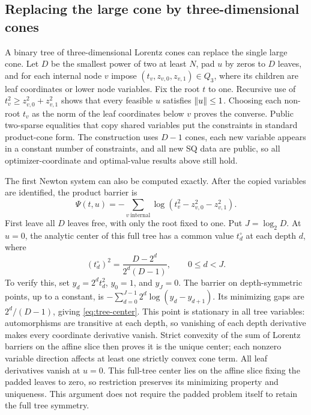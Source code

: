 \subsection{Replacing the large cone by three-dimensional cones}

A binary tree of three-dimensional Lorentz cones can replace the single
large cone.  Let $D$ be the smallest power of two at
least $N$, pad $u$ by zeros to $D$ leaves, and for each internal node
$v$ impose $(t_v,z_{v,0},z_{v,1})\in Q_3$, where its children are leaf
coordinates or lower node variables.  Fix the root $t$ to one.
Recursive use of $t_v^2\geq z_{v,0}^2+z_{v,1}^2$ shows that every feasible
$u$ satisfies $\left\lVert u\right\rVert\leq1$.  Choosing each non-root $t_v$
as the norm of the leaf coordinates below $v$ proves the converse.  Public two-sparse equalities that copy
shared variables put the constraints in standard product-cone form.  The
construction uses $D-1$ cones, each new variable appears in a constant
number of constraints, and all new SQ data are public, so all
optimizer-coordinate and optimal-value results above still hold.

The first Newton system can also be computed exactly.  After the copied
variables are identified, the product barrier is
\[
 \Psi(t,u)=-\sum_{v\ \mathrm{internal}}
       \log(t_v^2-z_{v,0}^2-z_{v,1}^2).
\]
First leave all $D$ leaves free, with only the root fixed to one.
Put $J=\log_2D$.  At $u=0$, the analytic center of this full tree has
a common value $t_d^\circ$ at each depth $d$, where
\begin{equation}\label{eq:tree-center}
 (t_d^\circ)^2=\frac{D-2^d}{2^d(D-1)},\qquad0\leq d<J.
\end{equation}
To verify this, set $y_d=2^dt_d^2$, $y_0=1$, and $y_J=0$.
The barrier on depth-symmetric points, up to a constant, is
$-\sum_{d=0}^{J-1}2^d\log(y_d-y_{d+1})$.
Its minimizing gaps are $2^d/(D-1)$, giving
\eqref{eq:tree-center}.  This point is stationary in all tree variables:
automorphisms are transitive at each depth, so vanishing of each depth
derivative makes every coordinate derivative vanish.
Strict convexity of the sum of Lorentz barriers on the affine slice
then proves it is the unique center; each nonzero variable direction
affects at least one strictly convex cone term.  All leaf derivatives
vanish at $u=0$. This full-tree center lies on the affine slice fixing
the padded leaves to zero, so restriction preserves its minimizing
property and uniqueness. This argument does not require the padded
problem itself to retain the full tree symmetry.

